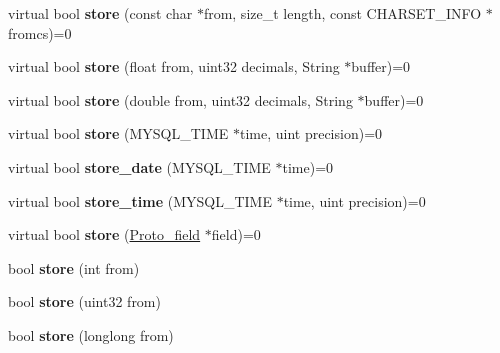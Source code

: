 \begin{DoxyCompactItemize}
\item 
\mbox{\label{classProtocol_a1c5150aca2a7de8e35e950bf067dd111}} 
virtual bool {\bfseries store} (const char $\ast$from, size\+\_\+t length, const C\+H\+A\+R\+S\+E\+T\+\_\+\+I\+N\+FO $\ast$fromcs)=0
\item 
\mbox{\label{classProtocol_a92f9322a5bc87dd18a4de563ae45e49e}} 
virtual bool {\bfseries store} (float from, uint32 decimals, String $\ast$buffer)=0
\item 
\mbox{\label{classProtocol_a07a617fd8dc08af488891f262b2b4a16}} 
virtual bool {\bfseries store} (double from, uint32 decimals, String $\ast$buffer)=0
\item 
\mbox{\label{classProtocol_afb4df65976d86deb0982c3f17ad571ea}} 
virtual bool {\bfseries store} (M\+Y\+S\+Q\+L\+\_\+\+T\+I\+ME $\ast$time, uint precision)=0
\item 
\mbox{\label{classProtocol_a7712fec6e80842c0bcf27d7c24ca9d57}} 
virtual bool {\bfseries store\+\_\+date} (M\+Y\+S\+Q\+L\+\_\+\+T\+I\+ME $\ast$time)=0
\item 
\mbox{\label{classProtocol_af6bc1815beaf5e727c4908ba3aa16ef2}} 
virtual bool {\bfseries store\+\_\+time} (M\+Y\+S\+Q\+L\+\_\+\+T\+I\+ME $\ast$time, uint precision)=0
\item 
\mbox{\label{classProtocol_aa6ed0869bd5ba27aff0e84b046391310}} 
virtual bool {\bfseries store} (\mbox{\hyperlink{classProto__field}{Proto\+\_\+field}} $\ast$field)=0
\item 
\mbox{\label{classProtocol_adc94cefd9bdba20f8b9698a9fe783f40}} 
bool {\bfseries store} (int from)
\item 
\mbox{\label{classProtocol_a0423b50aaac27ea58626560425f655ce}} 
bool {\bfseries store} (uint32 from)
\item 
\mbox{\label{classProtocol_a30d3cec3a68d57edad62efdf6d6d806e}} 
bool {\bfseries store} (longlong from)
\item 
\mbox{\label{classProtocol_a49d24faa3d8c2b42c25d4b6551205a81}} 

\end{DoxyCompactItemize}
